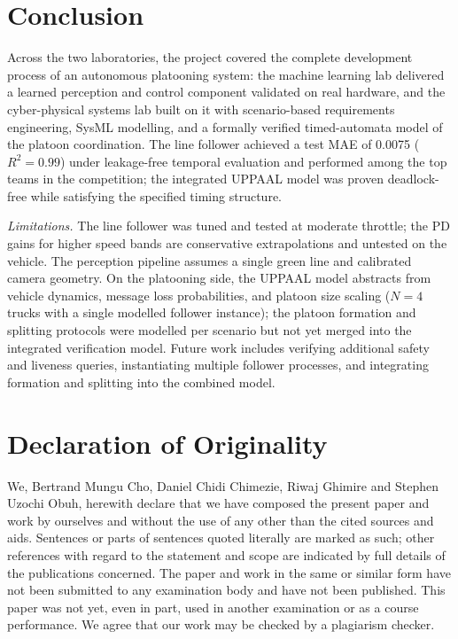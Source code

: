 \documentclass[english]{lni}
\begin{document}
\newpage
\section{Conclusion}
Across the two laboratories, the project covered the complete development process of an autonomous platooning system: the machine learning lab delivered a learned perception and control component validated on real hardware, and the cyber-physical systems lab built on it with scenario-based requirements engineering, SysML modelling, and a formally verified timed-automata model of the platoon coordination. The line follower achieved a test MAE of 0.0075 ($R^2 = 0.99$) under leakage-free temporal evaluation and performed among the top teams in the competition; the integrated UPPAAL model was proven deadlock-free while satisfying the specified timing structure.

\emph{Limitations.} The line follower was tuned and tested at moderate throttle; the PD gains for higher speed bands are conservative extrapolations and untested on the vehicle. The perception pipeline assumes a single green line and calibrated camera geometry. On the platooning side, the UPPAAL model abstracts from vehicle dynamics, message loss probabilities, and platoon size scaling ($N = 4$ trucks with a single modelled follower instance); the platoon formation and splitting protocols were modelled per scenario but not yet merged into the integrated verification model. Future work includes verifying additional safety and liveness queries, instantiating multiple follower processes, and integrating formation and splitting into the combined model.

\newpage
\section{Declaration of Originality}
We, Bertrand Mungu Cho, Daniel Chidi Chimezie, Riwaj Ghimire and Stephen Uzochi Obuh, herewith declare that we have composed the present paper and work by ourselves and without the use of any other than the cited sources and aids. Sentences or parts of sentences quoted literally are marked as such; other references with regard to the statement and scope are indicated by full details of the publications concerned. The paper and work in the same or similar form have not been submitted to any examination body and have not been published. This paper was not yet, even in part, used in another examination or as a course performance. We agree that our work may be checked by a plagiarism checker.
\end{document}
